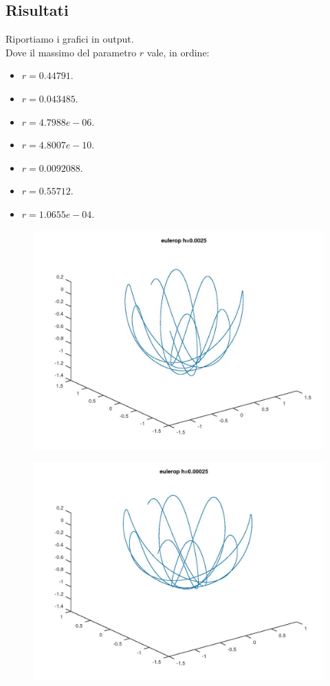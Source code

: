 \documentclass{article}
\begin{document}
	\subsection{Risultati}
	Riportiamo i grafici in output.\\
	Dove il massimo del parametro $r$ vale, in ordine:
	\begin{itemize}
		\item $r = 0.44791$.
		\item $r = 0.043485$.
		\item $r = 4.7988e-06$.
		\item $r = 4.8007e-10$.
		\item $r = 0.0092088$.
		\item $r = 0.55712$.
		\item $r = 1.0655e-04$.
	\end{itemize}
	\begin{figure}[htp!]
		\centering 
		\includegraphics[width=\textwidth]{6_1_1.jpeg}
	\end{figure}
	\begin{figure}[htp!]
		\centering 
		\includegraphics[width=\textwidth]{6_1_2.jpeg}
	\end{figure}
\end{document}
